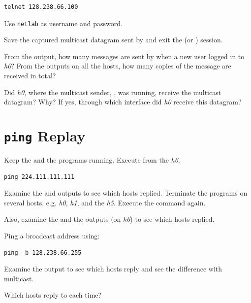\documentclass{../UTNetLab}
\begin{document}
\begin{lstlisting}
telnet 128.238.66.100
\end{lstlisting}
Use \texttt{netlab} as username and password.

Save the captured multicast datagram sent by  and exit the  (or ) session.

\begin{report}
    \item From the  output, how many messages are sent by  when a new user logged in to \textit{h0}?
    From the  outputs on all the hosts, how many copies of the message are received in total?

    \item Did \textit{h0}, where the multicast sender, , was running, receive the multicast datagram?
    Why?
    If yes, through which interface did \textit{h0} receive this datagram?
\end{report}

\section{\texttt{ping} Replay}
Keep the  and the  programs running.
Execute  from the \textit{h6}.

\begin{lstlisting}
ping 224.111.111.111
\end{lstlisting}
Examine the  and  outputs to see which hosts replied.
Terminate the  programs on several hosts, e.g. \textit{h0}, \textit{h1}, and the \textit{h5}.
Execute the  command again.

Also, examine the  and the  outputs (on \textit{h6}) to see which hosts replied.

Ping a broadcast address using:

\begin{lstlisting}
ping -b 128.238.66.255
\end{lstlisting}
Examine the  output to see which hosts reply and see the difference with multicast.

\begin{report}
    \item Which hosts reply to  each time?
\end{report}
\end{document}
